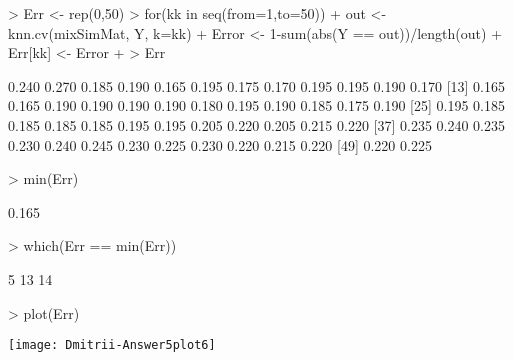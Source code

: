 \documentclass{article}
\begin{document}
\begin{Schunk}
\begin{Sinput}
> Err <- rep(0,50)
> for(kk in seq(from=1,to=50)){
+   out <- knn.cv(mixSimMat, Y, k=kk)
+   Error <- 1-sum(abs(Y == out))/length(out)
+   Err[kk] <- Error   
+ }
> Err
\end{Sinput}
\begin{Soutput}
 [1] 0.240 0.270 0.185 0.190 0.165 0.195 0.175 0.170 0.195 0.195 0.190 0.170
[13] 0.165 0.165 0.190 0.190 0.190 0.190 0.180 0.195 0.190 0.185 0.175 0.190
[25] 0.195 0.185 0.185 0.185 0.185 0.195 0.195 0.205 0.220 0.205 0.215 0.220
[37] 0.235 0.240 0.235 0.230 0.240 0.245 0.230 0.225 0.230 0.220 0.215 0.220
[49] 0.220 0.225
\end{Soutput}
\begin{Sinput}
> min(Err)  
\end{Sinput}
\begin{Soutput}
[1] 0.165
\end{Soutput}
\begin{Sinput}
> which(Err == min(Err))
\end{Sinput}
\begin{Soutput}
[1]  5 13 14
\end{Soutput}
\end{Schunk}
\begin{Schunk}
\begin{Sinput}
> plot(Err)
\end{Sinput}
\end{Schunk}
\texttt{[image: Dmitrii-Answer5plot6]}
\end{document}
